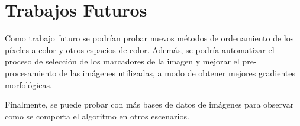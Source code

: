 \section{Trabajos Futuros}
\label{chap:futuros}

Como trabajo futuro se podrían probar nuevos métodos de ordenamiento de los píxeles a color y otros espacios de color. Además, se podría automatizar el proceso de selección de los marcadores de la imagen y mejorar el pre-procesamiento de las imágenes utilizadas, a modo de obtener mejores gradientes morfológicas. 

Finalmente, se puede probar con más bases de datos de imágenes para observar como se comporta el algoritmo en otros escenarios.